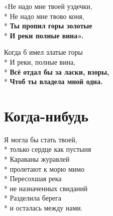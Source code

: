 \medskip

\begin{minipage}{\linewidth}
«Не надо мне твоей уздечки,\\*
Не надо мне твово коня,\\*
\textbf{Ты пропил горы золотые}\\*
\textbf{И реки полные вина». }\\
\end{minipage}\par\medskip\nobreak

\medskip

\begin{minipage}{\linewidth}
Когда б имел златые горы\\*
И реки, полные вина,\\*
\textbf{Всё отдал бы за ласки, взоры,}\\*
\textbf{Чтоб ты владела мной одна.}\\
\end{minipage}

\vspace{\fill}\newpage

\section{Когда-нибудь}
\label{song:Когда-нибудь}

\medskip

\begin{minipage}{\linewidth}
Я могла бы стать твоей,\\*
только сердце как пустыня\\*
Караваны журавлей\\*
пролетают к морю мимо\\*
Пересохшая река\\*
не назначенных свиданий\\*
Разделила берега\\*
и осталась между нами.\\
\end{minipage}\par\medskip\nobreak

\medskip

